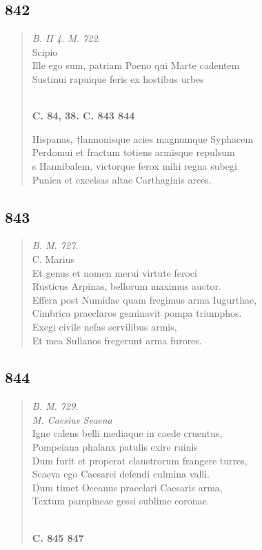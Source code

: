 \documentclass[11pt, a4paper]{report}
\begin{document}
            \subsection*{842}
      \begin{verse}
      \textit{B. II 4. M. 722.} \\ Scipio \\ Ille ego sum, patriam Poeno qui Marte cadentem \\ Sustinui rapuique feris ex hostibus urbes \\ 
        ﻿\pagebreak 
    \begin{center} \textbf{C. 84, 38. C. 843 844} \end{center} \marginpar{[305]} Hispanas, †lannonisque acies magnumque Syphacem \\ Perdomui et fractum totiens armisque repulsum \\ s Hannibalem, victorque ferox mihi regna subegi \\ Punica et excelsas altae Carthaginis arces. \\ 
      \end{verse}
  
            \subsection*{843}
      \begin{verse}
      \textit{B. M. 727.} \\ C. Marius \\ Et genus et nomen merui virtute feroci \\ Rusticus Arpinas, bellorum maximus auctor. \\ Effera post Numidae quam fregimus arma Iugurthae, \\ Cimbrica praeclaros geminavit pompa triumphos. \\ Exegi civile nefas servilibus armis, \\ Et mea Sullanos fregerunt arma furores. \\ 
      \end{verse}
  
            \subsection*{844}
      \begin{verse}
      \textit{B. M. 729.} \\ \textit{M. Caesius Seaena} \\ Igne calens belli mediaque in caede cruentus, \\ Pompeiana phalanx patulis exire ruinis \\ Dum furit et properat claustrorum frangere turres, \\ Scaeva ego Caesarei defendi culmina valli. \\ Dum timet Oceanus praeclari Caesaris arma, \\ Textum pampineae gessi sublime coronae. \\ 
        ﻿\pagebreak 
    \begin{center} \textbf{C. 845 847} \end{center} \marginpar{[306]} 
      \end{verse}
  
\end{document}
